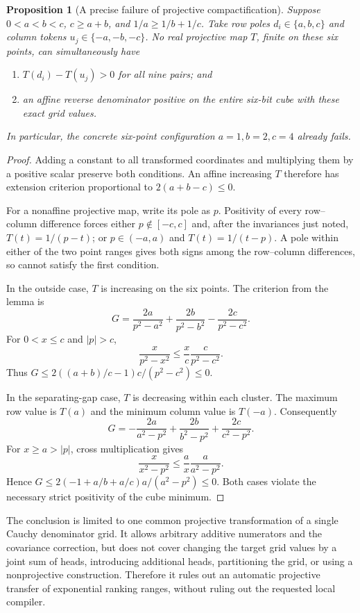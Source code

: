 \documentclass[11pt]{article}
\newtheorem{proposition}{Proposition}
\begin{document}
\begin{proposition}[A precise failure of projective compactification]
Suppose $0<a<b<c$, $c\ge a+b$, and $1/a\ge1/b+1/c$.
Take row poles $d_i\in\{a,b,c\}$ and column tokens
$u_j\in\{-a,-b,-c\}$. No real projective map $T$, finite on these
six points, can simultaneously have
\begin{enumerate}
\item $T(d_i)-T(u_j)>0$ for all nine pairs; and
\item an affine reverse denominator positive on the entire six-bit cube
with these exact grid values.
\end{enumerate}
In particular, the concrete six-point configuration $a=1,b=2,c=4$
already fails.
\end{proposition}
\begin{proof}
Adding a constant to all transformed coordinates and multiplying them by
a positive scalar preserve both conditions. An affine increasing $T$
therefore has extension criterion proportional to
$2(a+b-c)\le0$.

For a nonaffine projective map, write its pole as $p$. Positivity of every
row--column difference forces either $p\notin[-c,c]$ and, after the
invariances just noted, $T(t)=1/(p-t)$; or $p\in(-a,a)$ and
$T(t)=1/(t-p)$. A pole within either of the two point ranges gives both
signs among the row--column differences, so cannot satisfy the first
condition.

In the outside case, $T$ is increasing on the six points. The criterion
from the lemma is
\[
 G=\frac{2a}{p^2-a^2}+\frac{2b}{p^2-b^2}
       -\frac{2c}{p^2-c^2}.
\]
For $0<x\le c$ and $|p|>c$,
\[
 \frac{x}{p^2-x^2}\le\frac{x}{c}\frac{c}{p^2-c^2}.
\]
Thus $G\le2((a+b)/c-1)c/(p^2-c^2)\le0$.

In the separating-gap case, $T$ is decreasing within each cluster.
The maximum row value is $T(a)$ and the minimum column value is $T(-a)$.
Consequently
\[
 G=-\frac{2a}{a^2-p^2}+\frac{2b}{b^2-p^2}
       +\frac{2c}{c^2-p^2}.
\]
For $x\ge a>|p|$, cross multiplication gives
\[
 \frac{x}{x^2-p^2}\le\frac{a}{x}\frac{a}{a^2-p^2}.
\]
Hence $G\le2(-1+a/b+a/c)a/(a^2-p^2)\le0$.
Both cases violate the necessary strict positivity of the cube minimum.
\end{proof}

The conclusion is limited to one common projective transformation of a
single Cauchy denominator grid. It allows arbitrary additive numerators
and the covariance correction, but does not cover changing the target
grid values by a joint sum of heads, introducing additional heads,
partitioning the grid, or using a nonprojective construction. Therefore
it rules out an automatic projective transfer of exponential ranking
ranges, without ruling out the requested local compiler.
\end{document}

